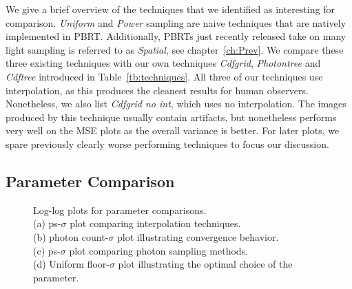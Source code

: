 We give a brief overview of the techniques that we identified as interesting for comparison. \textit{Uniform} and \textit{Power} sampling are naive techniques that are natively implemented in PBRT. Additionally, PBRTs just recently released take on many light sampling is referred to as \textit{Spatial}, see chapter~\ref{ch:Prev}. We compare these three existing techniques with our own techniques \textit{Cdfgrid}, \textit{Photontree} and \textit{Cdftree} introduced in Table~\ref{tb:techniques}. All three of our techniques use interpolation, as this produces the cleanest results for human observers. Nonetheless, we also list \textit{Cdfgrid no int}, which uses no interpolation. The images produced by this technique usually contain artifacts, but nonetheless performs very well on the MSE plots as the overall variance is better. For later plots, we spare previously clearly worse performing techniques to focus our discussion.

\subsection{Parameter Comparison}

\begin{figure}
    \centering
    \begin{subfigure}{.25\textwidth}
      \centering
        \caption{}
        \label{fig:intmain}
    \end{subfigure}%
    \begin{subfigure}{.25\textwidth}
        \caption{}
        \label{fig:pcplot}
    \end{subfigure}%
    \begin{subfigure}{.25\textwidth}
        \caption{}
        \label{fig:unipowplot}
    \end{subfigure}%
    \begin{subfigure}{.25\textwidth}
        \caption{}
        \label{fig:unifloorplot}
    \end{subfigure}
    \caption{Log-log plots for parameter comparisons. \\
    (a) ps-$\sigma$ plot comparing interpolation techniques. \\
    (b) photon count-$\sigma$ plot illustrating convergence behavior. \\
    (c) ps-$\sigma$ plot comparing photon sampling methods. \\
    (d) Uniform floor-$\sigma$ plot illustrating the optimal choice of the parameter.}
    \label{fig:parammain}
\end{figure}

